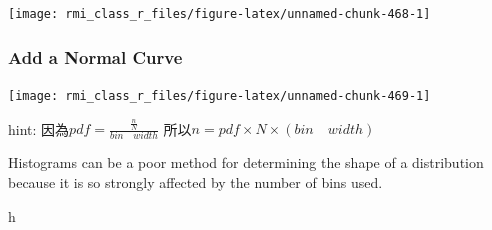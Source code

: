\documentclass[]{book}
\newenvironment{Shaded}{\begin{snugshade}}{\end{snugshade}}
\newcommand{\DataTypeTok}[1]{\textcolor[rgb]{0.13,0.29,0.53}{#1}}
\newcommand{\DecValTok}[1]{\textcolor[rgb]{0.00,0.00,0.81}{#1}}
\newcommand{\KeywordTok}[1]{\textcolor[rgb]{0.13,0.29,0.53}{\textbf{#1}}}
\newcommand{\NormalTok}[1]{#1}
\newcommand{\OperatorTok}[1]{\textcolor[rgb]{0.81,0.36,0.00}{\textbf{#1}}}
\newcommand{\StringTok}[1]{\textcolor[rgb]{0.31,0.60,0.02}{#1}}
\theoremstyle{definition}
\theoremstyle{definition}
\theoremstyle{definition}
\theoremstyle{remark}
\begin{document}
\begin{center}\texttt{[image: rmi\_class\_r\_files/figure-latex/unnamed-chunk-468-1]} \end{center}

\hypertarget{add-a-normal-curve}{%
\subsubsection{Add a Normal Curve}\label{add-a-normal-curve}}

\begin{Shaded}
\end{Shaded}

\begin{center}\texttt{[image: rmi\_class\_r\_files/figure-latex/unnamed-chunk-469-1]} \end{center}

hint: 因為\(pdf=\frac{\frac{n}{N}}{bin \quad width}\)
所以\(n=pdf\times N \times (bin \quad width)\)

Histograms can be a poor method for determining the shape of a
distribution because it is so strongly affected by the number of bins
used.

\begin{Shaded}
\begin{Highlighting}[]
\NormalTok{h}
\end{Highlighting}
\end{Shaded}
\end{document}
